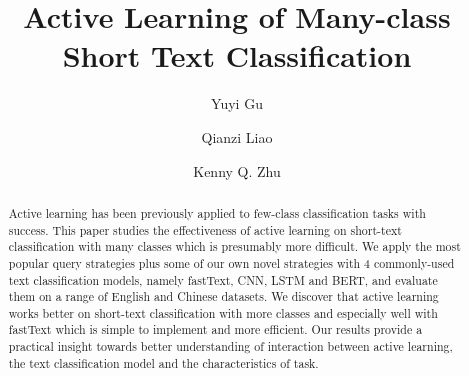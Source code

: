 \documentclass[sigconf,anonymous]{acmart}
\title{Active Learning of Many-class Short Text Classification}
\author{Yuyi Gu}
\affiliation{%
	\institution{Shanghai Jiao Tong University}
}
\author{Qianzi Liao}
\affiliation{%
	\institution{Shanghai Jiao Tong University}
}
\author{Kenny Q. Zhu}
\affiliation{%
	\institution{Shanghai Jiao Tong University}
}
\theoremstyle{definition}
\newcommand{\EVE}[1]{\textcolor{red}{eve: #1}}
\begin{document}
\begin{abstract}
Active learning has been previously applied to few-class classification tasks
with success. This paper studies the effectiveness of active learning on
short-text classification with many classes which is presumably more difficult.
We apply the most popular query strategies plus some of our own
novel strategies with 4 commonly-used text classification models, 
namely fastText, CNN, LSTM and BERT, and evaluate them on a range of 
English and Chinese datasets. We discover that active learning 
works better on short-text classification with more classes and 
especially well with fastText which is simple to implement and more efficient. 
Our results provide a practical insight towards 
better understanding of interaction between active learning, 
the text classification model and the characteristics of task.   
\end{abstract}

\maketitle




%


% 



%


% 
\end{document}
